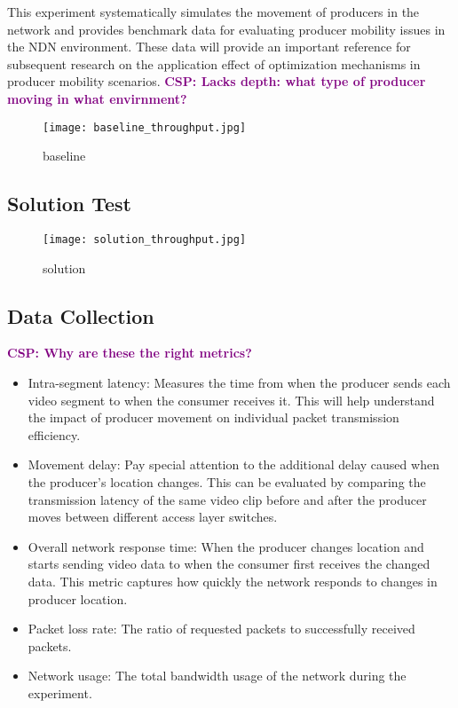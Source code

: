 \documentclass[conference]{IEEEtran}
\newcommand{\csp}[1]{\textbf{\textcolor{purple}{CSP: #1}}}
\begin{document}
This experiment systematically simulates the movement of producers in the network and provides benchmark data for evaluating producer mobility issues in the NDN environment. These data will provide an important reference for subsequent research on the application effect of optimization mechanisms in producer mobility scenarios.
\csp{Lacks depth: what type of producer moving in what envirnment?}

\begin{figure}
    \centering
    \texttt{[image: baseline\_throughput.jpg]}
    \caption{baseline}
    \label{fig:enter-label}
\end{figure}

\subsection{Solution Test}

\begin{figure}
    \centering
    \texttt{[image: solution\_throughput.jpg]}
    \caption{solution}
    \label{fig:enter-label}
\end{figure}

\subsection{Data Collection}
\csp{Why are these the right metrics?}
\begin{itemize}
    \item Intra-segment latency: Measures the time from when the producer sends each video segment to when the consumer receives it. This will help understand the impact of producer movement on individual packet transmission efficiency.
    \item Movement delay: Pay special attention to the additional delay caused when the producer's location changes. This can be evaluated by comparing the transmission latency of the same video clip before and after the producer moves between different access layer switches.
    \item Overall network response time: When the producer changes location and starts sending video data to when the consumer first receives the changed data. This metric captures how quickly the network responds to changes in producer location.
    \item Packet loss rate: The ratio of requested packets to successfully received packets.
    \item Network usage: The total bandwidth usage of the network during the experiment.
\end{itemize}
\end{document}
